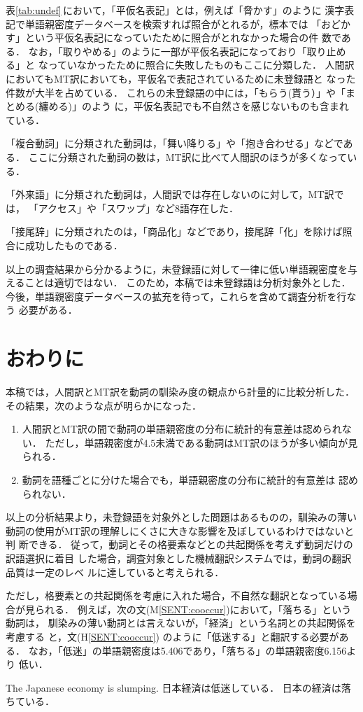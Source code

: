 表\ref{tab:undef}\,において，「平仮名表記」とは，例えば「脅かす」のように
漢字表記で単語親密度データベースを検索すれば照合がとれるが，標本では
「おどかす」という平仮名表記になっていたために照合がとれなかった場合の件
数である．
なお，「取りやめる」のように一部が平仮名表記になっており「取り止める」と
なっていなかったために照合に失敗したものもここに分類した．
人間訳においてもMT訳においても，平仮名で表記されているために未登録語と
なった件数が大半を占めている．
これらの未登録語の中には，「もらう(貰う）」や「まとめる(纏める)」のよう
に，平仮名表記でも不自然さを感じないものも含まれている．

「複合動詞」に分類された動詞は，「舞い降りる」や「抱き合わせる」などである．
ここに分類された動詞の数は，MT訳に比べて人間訳のほうが多くなっている．

「外来語」に分類された動詞は，人間訳では存在しないのに対して，MT訳では，
「アクセス」や「スワップ」など8語存在した．

「接尾辞」に分類されたのは，「商品化」などであり，接尾辞「化」を除けば照
合に成功したものである． 

以上の調査結果から分かるように，未登録語に対して一律に低い単語親密度を与
えることは適切ではない．
このため，本稿では未登録語は分析対象外とした．
今後，単語親密度データベースの拡充を待って，これらを含めて調査分析を行なう
必要がある． 

\section{おわりに}
\label{sec:conc}

本稿では，人間訳とMT訳を動詞の馴染み度の観点から計量的に比較分析した．
その結果，次のような点が明らかになった．
\begin{enumerate}
\item 人間訳とMT訳の間で動詞の単語親密度の分布に統計的有意差は認められな
い．
ただし，単語親密度が4.5未満である動詞はMT訳のほうが多い傾向が見られる．
\item 動詞を語種ごとに分けた場合でも，単語親密度の分布に統計的有意差は
認められない．
\end{enumerate}

以上の分析結果より，未登録語を対象外とした問題はあるものの，馴染みの薄い
動詞の使用がMT訳の理解しにくさに大きな影響を及ぼしているわけではないと判
断できる． 
従って，動詞とその格要素などとの共起関係を考えず動詞だけの訳語選択に着目
した場合，調査対象とした機械翻訳システムでは，動詞の翻訳品質は一定のレベ
ルに達していると考えられる．

ただし，格要素との共起関係を考慮に入れた場合，不自然な翻訳となっている場
合が見られる．
例えば，次の文(M\ref{SENT:cooccur})において，「落ちる」という動詞は，
馴染みの薄い動詞とは言えないが，「経済」という名詞との共起関係を考慮する
と，文(H\ref{SENT:cooccur}) のように「低迷する」と翻訳する必要がある．
なお，「低迷」の単語親密度は5.406であり，「落ちる」の単語親密度6.156より
低い．
\begin{SENT2}
\sentE The Japanese economy is slumping.
\sentH 日本経済は低迷している．
\sentM 日本の経済は落ちている．
\label{SENT:cooccur}
\end{SENT2}

